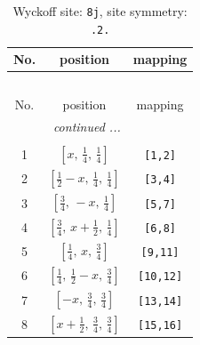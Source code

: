 \documentclass[fleqn,8pt]{jsarticle}
\begin{document}
\begin{longtable}{ccc}
\caption{Wyckoff site: {\tt 8j}, site symmetry: {\tt .2.}}
 \\
 \hline \hline
No. & position & mapping \\ \hline \endfirsthead

\multicolumn{2}{l}{\tablename\ \thetable{}} \\
 \hline \hline
No. & position & mapping \\ \hline \endhead

 \hline \hline
\multicolumn{2}{r}{\footnotesize\it continued ...} \\ \endfoot

 \hline \hline
\multicolumn{2}{r}{} \\ \endlastfoot

1 & $\left[ x,\, \frac{1}{4},\, \frac{1}{4} \right]$ & {\tt [1,2]} \\ \hline
2 & $\left[ \frac{1}{2} - x,\, \frac{1}{4},\, \frac{1}{4} \right]$ & {\tt [3,4]} \\ \hline
3 & $\left[ \frac{3}{4},\, - x,\, \frac{1}{4} \right]$ & {\tt [5,7]} \\ \hline
4 & $\left[ \frac{3}{4},\, x + \frac{1}{2},\, \frac{1}{4} \right]$ & {\tt [6,8]} \\ \hline
5 & $\left[ \frac{1}{4},\, x,\, \frac{3}{4} \right]$ & {\tt [9,11]} \\ \hline
6 & $\left[ \frac{1}{4},\, \frac{1}{2} - x,\, \frac{3}{4} \right]$ & {\tt [10,12]} \\ \hline
7 & $\left[ - x,\, \frac{3}{4},\, \frac{3}{4} \right]$ & {\tt [13,14]} \\ \hline
8 & $\left[ x + \frac{1}{2},\, \frac{3}{4},\, \frac{3}{4} \right]$ & {\tt [15,16]} \\
\end{longtable}
\renewcommand{\arraystretch}{1.2}
\end{document}
